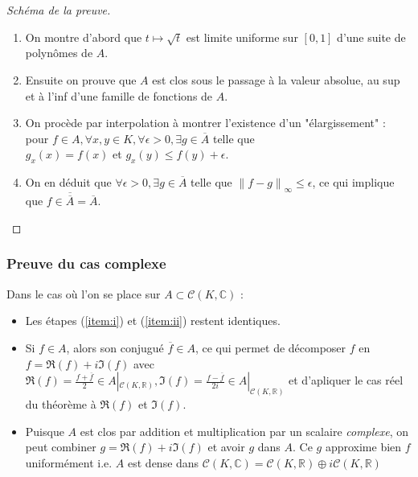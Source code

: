 \documentclass[
	10pt, %
	xcolor={svgnames}
]{beamer}
\begin{document}
\begin{frame}
\begin{proof}[Schéma de la preuve]
	\begin{enumerate}
	\item On montre d'abord que \( t \mapsto \sqrt{t} \) est limite uniforme sur \( [0,1] \) d'une suite de polynômes de \( A \). \label{item:i}
		\item Ensuite on prouve que \( A \) est clos sous le passage à la valeur absolue, au sup et à l'inf d'une famille de fonctions de \( A \). \label{item:ii}
		\item On procède par interpolation à montrer l'existence d'un "élargissement" : pour \( f \in A, \forall x,y \in K, \forall \epsilon > 0, \exists g \in \overline{A} \) telle que \\\( g_{x}(x) = f(x) \) et \( g_{x}(y) \leq f(y) + \epsilon \). \label{item:iii}
		\item On en déduit que \( \forall\epsilon > 0, \exists g \in \overline{A} \) telle que \( {\left\lVert f-g \right\rVert_{\infty}} \le \epsilon \), ce qui implique que \( f \in \overline{\overline{A}} = \overline{A} \). \label{item:iv}
	\end{enumerate}	
\end{proof}
\end{frame}


\begin{frame}
	\frametitle{Preuve du cas complexe}
\par Dans le cas où l'on se place sur \( A \subset \mathcal{C}(K,\mathbb{C}) \) :
\begin{itemize}
	\item Les étapes (\ref{item:i}) et (\ref{item:ii}) restent identiques.
	\item Si \( f \in A \), alors son conjugué \( \overline{f} \in A \), ce qui permet de décomposer \( f \) en \( f = \Re(f) + i\Im(f) \) avec \( \Re(f) = \frac{f + \overline{f}}{2}\in A|_{\mathcal{C}(K,\mathbb{R})}, \Im(f) = \frac{f - \overline{f}}{2i} \in A|_{\mathcal{C}(K,\mathbb{R})} \) et d'apliquer le cas réel du théorème à \( \Re(f) \) et \( \Im(f) \).
	\item Puisque \( A \) est clos par addition et multiplication par un scalaire \textit{complexe}, on peut combiner \( g = \Re(f) + i\Im(f) \) et avoir \( g \) dans \( A \). Ce \( g \) approxime bien \( f \) uniformément i.e. \( A \) est dense dans \( \mathcal{C}(K,\mathbb{C}) = \mathcal{C}(K,\mathbb{R}) \oplus i\mathcal{C}(K,\mathbb{R}) \)
	\nocite{stephenson1968spaces}

\end{itemize}
\end{frame}
\end{document}
